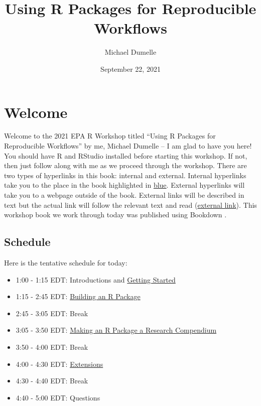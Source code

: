 \documentclass[
]{book}
\title{Using R Packages for Reproducible Workflows}
\author{Michael Dumelle}
\date{September 22, 2021}
\providecommand{\tightlist}{%
  \setlength{\itemsep}{0pt}\setlength{\parskip}{0pt}}
\begin{document}
\maketitle

{
\setcounter{tocdepth}{1}
\tableofcontents
}
\hypertarget{welcome}{%
\chapter*{Welcome}\label{welcome}}

Welcome to the 2021 EPA R Workshop titled ``Using R Packages for Reproducible Workflows'' by me, Michael Dumelle -- I am glad to have you here! You should have R and RStudio installed before starting this workshop. If not, then just follow along with me as we proceed through the workshop. There are two types of hyperlinks in this book: internal and external. Internal hyperlinks take you to the place in the book highlighted in \href{}{blue}. External hyperlinks will take you to a webpage outside of the book. External links will be described in text but the actual link will follow the relevant text and read (\href{}{external link}). This workshop book we work through today was published using Bookdown \citep{xie2016bookdown}.

\hypertarget{schedule}{%
\section*{Schedule}\label{schedule}}

Here is the tentative schedule for today:

\begin{itemize}
\tightlist
\item
  1:00 - 1:15 EDT: Introductions and \protect\hyperlink{getting-started}{Getting Started}
\item
  1:15 - 2:45 EDT: \protect\hyperlink{r-package}{Building an R Package}
\item
  2:45 - 3:05 EDT: Break
\item
  3:05 - 3:50 EDT: \protect\hyperlink{r-package-rc}{Making an R Package a Research Compendium}
\item
  3:50 - 4:00 EDT: Break
\item
  4:00 - 4:30 EDT: \protect\hyperlink{extensions}{Extensions}
\item
  4:30 - 4:40 EDT: Break
\item
  4:40 - 5:00 EDT: Questions
\end{itemize}
\end{document}
